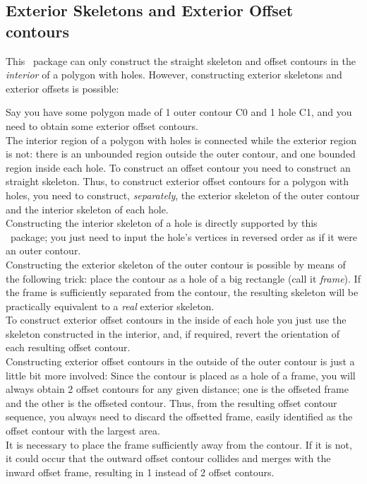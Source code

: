 \subsection{Exterior Skeletons and Exterior Offset contours}  

This \cgal\ package can only construct the straight skeleton and offset contours in the \textit{interior} of a polygon with holes. However, constructing exterior skeletons and exterior offsets is possible:

Say you have some polygon made of 1 outer contour C0 and 1 hole C1, and you need to obtain some exterior offset contours.\\
The interior region of a polygon with holes is connected while the exterior region is not: there is an unbounded region outside the outer contour, and one bounded region inside each hole.
To construct an offset contour you need to construct an straight skeleton. Thus, to construct exterior offset contours for a polygon with holes, you need to construct, {\em separately}, the exterior skeleton of the outer contour and the interior skeleton of each hole.\\
Constructing the interior skeleton of a hole is directly supported by this \cgal\ package; you just need to input the hole's vertices in reversed order as if it were an outer contour.\\
Constructing the exterior skeleton of the outer contour is possible by means of the following trick: place the contour as a hole of a big rectangle (call it {\em frame}). If the frame is sufficiently separated from the contour, the resulting skeleton will be practically equivalent to a \textit{real} exterior skeleton.\\
To construct exterior offset contours in the inside of each hole you just use the skeleton constructed in the interior, and, if required, revert the orientation of each resulting offset contour.\\
Constructing exterior offset contours in the outside of the outer contour is just a little bit more involved: Since the contour is placed as a hole of a frame, you will always obtain 2 offset contours for any given distance; one is the offseted frame and the other is the offseted contour. Thus, from the resulting offset contour sequence, you always need to discard the offsetted frame, easily identified as the offset contour with the largest area.\\
It is necessary to place the frame sufficiently away from the contour. If it is not, it could occur that the outward offset contour collides and merges with the inward offset frame, resulting in 1 instead of 2 offset contours.\\
